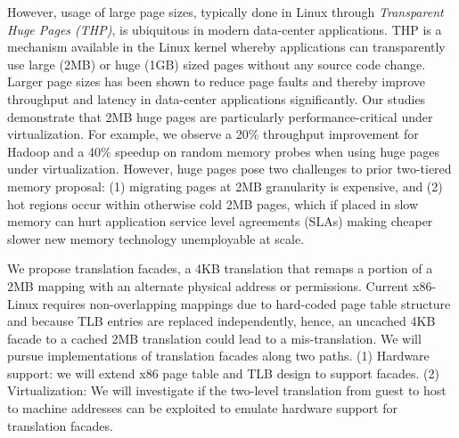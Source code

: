 However, usage of large page sizes, typically done in Linux through {\it
Transparent Huge Pages (THP)}, is ubiquitous in modern data-center applications.
THP is a mechanism available in the Linux kernel whereby applications can
transparently use large (2MB) or huge (1GB) sized pages without any source code
change. Larger page sizes has been shown to reduce page faults and thereby
improve throughput and latency in data-center applications significantly. Our
studies demonstrate that 2MB huge pages are particularly
performance-critical under virtualization.  For example, we observe 
a 20\% throughput improvement for Hadoop and a 40\% speedup on random memory
probes when using huge pages under virtualization.  However, huge pages pose two
challenges to prior two-tiered memory proposal: (1) migrating pages at 2MB
granularity is expensive, and (2) hot regions occur within otherwise cold 2MB
pages, which if placed in slow memory can hurt application service level
agreements (SLAs) making cheaper slower new memory technology unemployable at
scale.

We propose translation facades, a 4KB translation that remaps a portion of a 2MB
mapping with an alternate physical address or permissions.  Current x86-Linux
requires non-overlapping mappings due to hard-coded page table structure and
because TLB entries are replaced independently, hence, an uncached 4KB facade to
a cached 2MB translation could lead to a mis-translation. We will pursue
implementations of translation facades along two paths. (1) Hardware support: we
will extend x86 page table and TLB design to support facades. (2)
Virtualization:
We will investigate if the two-level translation
from guest to host to machine addresses can be exploited to emulate hardware
support for translation facades.
